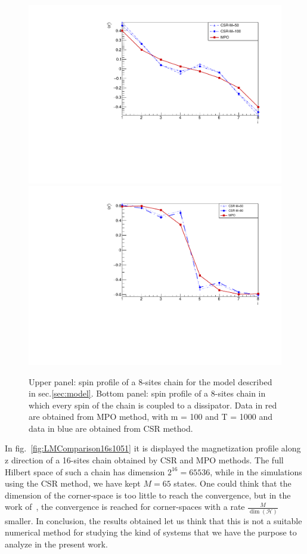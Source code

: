 \begin{figure}[H]
    \centering
    \includegraphics[scale=0.6]{Figures/8sites/1U1D_comparisonCSR_MPO_8site.pdf}
    \includegraphics[scale=0.6]{Figures/8sites/8sites_MPOvsCORNER_4U4D.pdf}
    \captionsetup{width=1.\linewidth}
    \caption{Upper panel: spin profile of a 8-sites chain for the model described in sec.\ref{sec:model}. Bottom panel: spin profile of a 8-sites chain in which every spin of the chain is coupled to a dissipator. Data in red are obtained from MPO method, with m = 100 and T = 1000 and data in blue are obtained from CSR method.}
    \label{fig:comparisonCSR_MPO_8site}
\end{figure}

In fig.~\ref{fig:LMComparison16s1051} it is displayed the magnetization profile along z direction of a 16-sites chain obtained by CSR and MPO methods. The full Hilbert space of such a chain has dimension $2^{16} = 65536$, while in the simulations using the CSR method, we have kept $M = 65$ states. One could think that the dimension of the corner-space is too little to reach the convergence, but in the work of~\cite{PhysRevLett.115.080604}, the convergence is reached for corner-spaces with a rate $\frac{M}{\dim(\mathcal{H})}$ smaller. In conclusion, the results obtained let us think that this is not a suitable numerical method for studying the kind of systems that we have the purpose to analyze in the present work.

